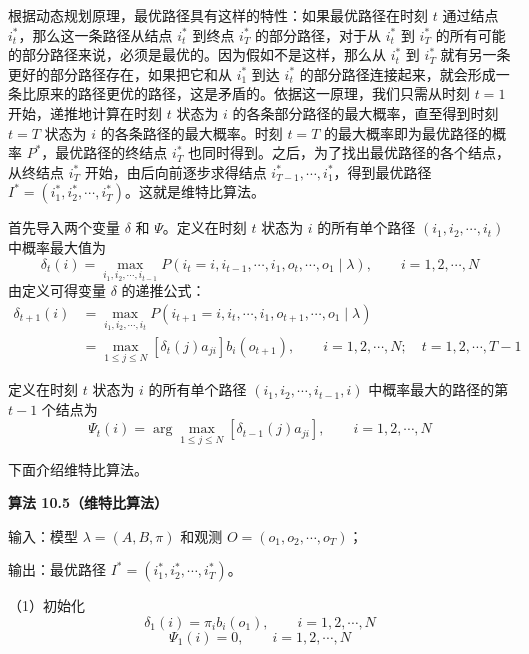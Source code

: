 \documentclass[UTF8,12pt,a4paper,fontset=fandol]{ctexart}
\begin{document}
根据动态规划原理，最优路径具有这样的特性：如果最优路径在时刻 $t$ 通过结点 $i_t^*$，那么这一条路径从结点 $i_t^*$ 到终点 $i_T^*$ 的部分路径，对于从 $i_t^*$ 到 $i_T^*$ 的所有可能的部分路径来说，必须是最优的。因为假如不是这样，那么从 $i_t^*$ 到 $i_T^*$ 就有另一条更好的部分路径存在，如果把它和从 $i_1^*$ 到达 $i_t^*$ 的部分路径连接起来，就会形成一条比原来的路径更优的路径，这是矛盾的。依据这一原理，我们只需从时刻 $t=1$ 开始，递推地计算在时刻 $t$ 状态为 $i$ 的各条部分路径的最大概率，直至得到时刻 $t=T$ 状态为 $i$ 的各条路径的最大概率。时刻 $t=T$ 的最大概率即为最优路径的概率 $P^*$，最优路径的终结点 $i_T^*$ 也同时得到。之后，为了找出最优路径的各个结点，从终结点 $i_T^*$ 开始，由后向前逐步求得结点 $i_{T-1}^*,\cdots,i_1^*$，得到最优路径 $I^*=(i_1^*,i_2^*,\cdots,i_T^*)$。这就是维特比算法。

首先导入两个变量 $\delta$ 和 $\Psi$。定义在时刻 $t$ 状态为 $i$ 的所有单个路径 $(i_1,i_2,\cdots,i_t)$ 中概率最大值为
\begin{equation}
  \delta_t(i)=\max_{i_1,i_2,\cdots,i_{t-1}}P(i_t=i,i_{t-1},\cdots,i_1,o_t,\cdots,o_1\mid\lambda),
  \qquad i=1,2,\cdots,N
  \tag{10.44}
\end{equation}
由定义可得变量 $\delta$ 的递推公式：
\begin{equation}
\begin{aligned}
  \delta_{t+1}(i)
  &=\max_{i_1,i_2,\cdots,i_t}P(i_{t+1}=i,i_t,\cdots,i_1,o_{t+1},\cdots,o_1\mid\lambda)\\
  &=\max_{1\le j\le N}[\delta_t(j)a_{ji}]b_i(o_{t+1}),\qquad
  i=1,2,\cdots,N;\quad t=1,2,\cdots,T-1
\end{aligned}
  \tag{10.45}
\end{equation}

定义在时刻 $t$ 状态为 $i$ 的所有单个路径 $(i_1,i_2,\cdots,i_{t-1},i)$ 中概率最大的路径的第 $t-1$ 个结点为
\begin{equation}
  \Psi_t(i)=\arg\max_{1\le j\le N}[\delta_{t-1}(j)a_{ji}],\qquad i=1,2,\cdots,N
  \tag{10.46}
\end{equation}

下面介绍维特比算法。

\noindent\textbf{算法 10.5（维特比算法）}\quad

输入：模型 $\lambda=(A,B,\pi)$ 和观测 $O=(o_1,o_2,\cdots,o_T)$；

输出：最优路径 $I^*=(i_1^*,i_2^*,\cdots,i_T^*)$。

（1）初始化
\[
  \delta_1(i)=\pi_i b_i(o_1),\qquad i=1,2,\cdots,N
\]
\[
  \Psi_1(i)=0,\qquad i=1,2,\cdots,N
\]
\end{document}
